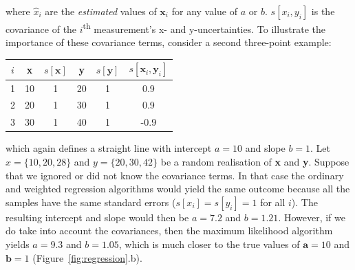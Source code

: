 \begin{refsection}
\noindent where $\hat{x}_i$ are the \emph{estimated} values of
$\mathbf{x}_i$ for any value of $a$ or $b$. $s[x_i,y_i]$ is the
covariance of the $i$\textsuperscript{th} measurement's x- and
y-uncertainties. To illustrate the importance of these covariance
terms, consider a second three-point example:

\begin{center}
\begin{tabular}{cccccc}
  $i$ & \textbf{x} & $s[\boldsymbol{x}]$ & \textbf{y} &
  $s[\boldsymbol{y}]$ & $s[\boldsymbol{x}_i,\boldsymbol{y}_i]$ \\
  \hline
  1 & 10 & 1 & 20 & 1 & 0.9 \\
  2 & 20 & 1 & 30 & 1 & 0.9 \\
  3 & 30 & 1 & 40 & 1 & -0.9
\end{tabular}
\end{center}

\noindent which again defines a straight line with intercept $a = 10$
and slope $b = 1$. Let $x = \{10,20,28\}$ and $y = \{20,30,42\}$ be a
random realisation of \textbf{x} and \textbf{y}. Suppose that we
ignored or did not know the covariance terms. In that case the
ordinary and weighted regression algorithms would yield the same
outcome because all the samples have the same standard errors ($s[x_i]
= s[y_i] = 1$ for all $i$). The resulting intercept and slope would
then be $a = 7.2$ and $b = 1.21$. However, if we do take into account
the covariances, then the maximum likelihood algorithm yields $a =
9.3$ and $b = 1.05$, which is much closer to the true values of
$\boldsymbol{a} = 10$ and $\boldsymbol{b} = 1$
(Figure~\ref{fig:regression}.b).


\end{refsection}
